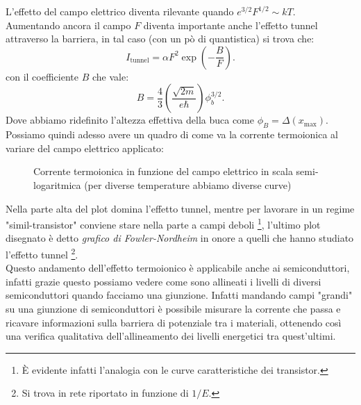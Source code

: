 L'effetto del campo elettrico diventa rilevante quando $e^{3 /2}F^{1 /2} \sim kT$.\\
Aumentando ancora il campo $F$ diventa importante anche l'effetto tunnel attraverso la barriera, in tal caso (con un pò di quantistica) si trova che:
\[
	I_{\text{tunnel}} = \alpha F^2\exp\left( -\frac{B}{F} \right) 
.\] 
con il coefficiente $B$ che vale:
\[
	B = \frac{4}{3}\left( \frac{\sqrt{2m} }{e \hbar} \right) \phi_{b}^{3 /2}
.\] 
Dove abbiamo ridefinito l'altezza effettiva della buca come $\phi _{B} = \Delta ( x_{\text{max}}) $.\\
Possiamo quindi adesso avere un quadro di come va la corrente termoionica al variare del campo elettrico applicato:
\begin{figure}[H]
    \centering
    \caption{\scriptsize Corrente termoionica in funzione del campo elettrico in scala semi-logaritmica (per diverse temperature abbiamo diverse curve)}
    \label{fig:corrente-termoionica-in-funzione-del-campo-elettrico}
\end{figure}
\noindent
Nella parte alta del plot domina l'effetto tunnel, mentre per lavorare in un regime "simil-transistor" conviene stare nella parte a campi deboli \footnote{È evidente infatti l'analogia con le curve caratteristiche dei transistor.}, l'ultimo plot disegnato è detto \textit{grafico di Fowler-Nordheim} in onore a quelli che hanno studiato l'effetto tunnel \footnote{Si trova in rete riportato in funzione di $1 /E$.}.\\
Questo andamento dell'effetto termoionico è applicabile anche ai semiconduttori, infatti grazie  questo possiamo vedere come sono allineati i livelli di diversi semiconduttori quando facciamo una giunzione. Infatti mandando campi "grandi" su una giunzione di semiconduttori è possibile misurare la corrente che passa e ricavare informazioni sulla barriera di potenziale tra i materiali, ottenendo così una verifica qualitativa dell'allineamento dei livelli energetici tra quest'ultimi. 

